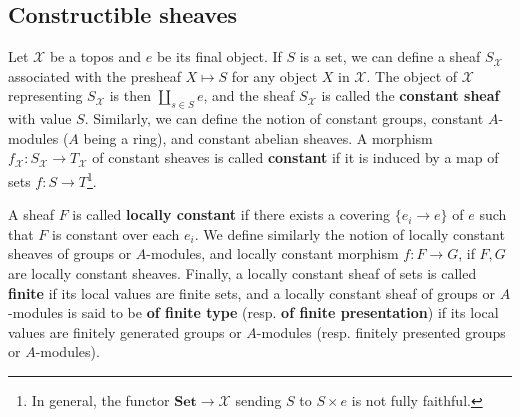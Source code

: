 \subsection{Constructible sheaves}
Let $\mathcal{X}$ be a topos and $e$ be its final object. If $S$ is a set, we can define a sheaf $S_\mathcal{X}$ associated with the presheaf $X\mapsto S$ for any object $X$ in $\mathcal{X}$. The object of $\mathcal{X}$ representing $S_\mathcal{X}$ is then $\coprod_{s\in S}e$, and the sheaf $S_\mathcal{X}$ is called the \textbf{constant sheaf} with value $S$. Similarly, we can define the notion of constant groups, constant $A$-modules ($A$ being a ring), and constant abelian sheaves. A morphism $f_\mathcal{X}:S_\mathcal{X}\to T_\mathcal{X}$ of constant sheaves is called \textbf{constant} if it is induced by a map of sets $f:S\to T$\footnote{In general, the functor $\mathbf{Set}\to\mathcal{X}$ sending $S$ to $S\times e$ is not fully faithful.}.\par
A sheaf $F$ is called \textbf{locally constant} if there exists a covering $\{e_i\to e\}$ of $e$ such that $F$ is constant over each $e_i$. We define similarly the notion of locally constant sheaves of groups or $A$-modules, and locally constant morphism $f:F\to G$, if $F,G$ are locally constant sheaves. Finally, a locally constant sheaf of sets is called \textbf{finite} if its local values are finite sets, and a locally constant sheaf of groups or $A$-modules is said to be \textbf{of finite type} (resp. \textbf{of finite presentation}) if its local values are finitely generated groups or $A$-modules (resp. finitely presented groups or $A$-modules).

